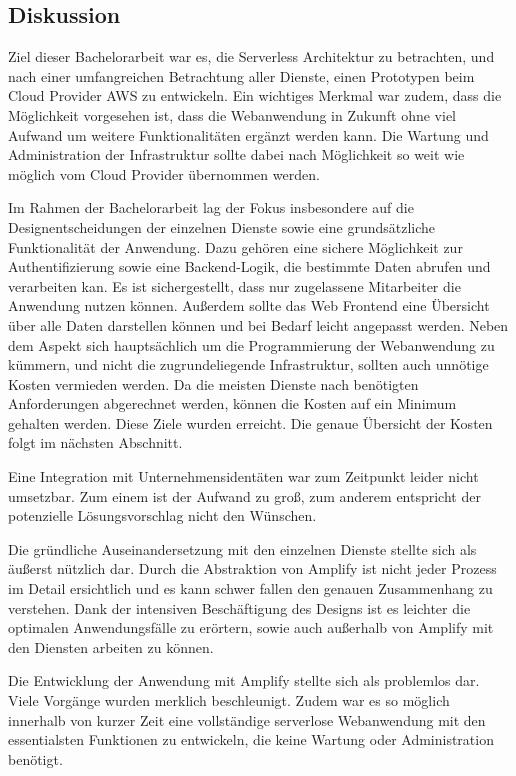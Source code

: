 \subsection{Diskussion}

Ziel dieser Bachelorarbeit war es, die Serverless Architektur zu betrachten, und nach einer umfangreichen Betrachtung aller Dienste, einen Prototypen beim Cloud Provider AWS zu entwickeln.
Ein wichtiges Merkmal war zudem, dass die Möglichkeit vorgesehen ist, dass die Webanwendung in Zukunft ohne viel Aufwand um weitere Funktionalitäten ergänzt werden kann.
Die Wartung und Administration der Infrastruktur sollte dabei nach Möglichkeit so weit wie möglich vom Cloud Provider übernommen werden.

Im Rahmen der Bachelorarbeit lag der Fokus insbesondere auf die Designentscheidungen der einzelnen Dienste sowie eine grundsätzliche Funktionalität der Anwendung.
Dazu gehören eine sichere Möglichkeit zur Authentifizierung sowie eine Backend-Logik, die bestimmte Daten abrufen und verarbeiten kan.
Es ist sichergestellt, dass nur zugelassene Mitarbeiter die Anwendung nutzen können.
Außerdem sollte das Web Frontend eine Übersicht über alle Daten darstellen können und bei Bedarf leicht angepasst werden.
Neben dem Aspekt sich hauptsächlich um die Programmierung der Webanwendung zu kümmern, und nicht die zugrundeliegende Infrastruktur, sollten auch unnötige Kosten vermieden werden.
Da die meisten Dienste nach benötigten Anforderungen abgerechnet werden, können die Kosten auf ein Minimum gehalten werden.
Diese Ziele wurden erreicht. Die genaue Übersicht der Kosten folgt im nächsten Abschnitt.

Eine Integration mit Unternehmensidentäten war zum Zeitpunkt leider nicht umsetzbar.
Zum einem ist der Aufwand zu groß, zum anderem entspricht der potenzielle Lösungsvorschlag nicht den Wünschen.

Die gründliche Auseinandersetzung mit den einzelnen Dienste stellte sich als äußerst nützlich dar.
Durch die Abstraktion von Amplify ist nicht jeder Prozess im Detail ersichtlich und es kann schwer fallen den genauen Zusammenhang zu verstehen.
Dank der intensiven Beschäftigung des Designs ist es leichter die optimalen Anwendungsfälle zu erörtern, sowie auch außerhalb von Amplify mit den Diensten arbeiten zu können.

Die Entwicklung der Anwendung mit Amplify stellte sich als problemlos dar.
Viele Vorgänge wurden merklich beschleunigt.
Zudem war es so möglich innerhalb von kurzer Zeit eine vollständige serverlose Webanwendung mit den essentialsten Funktionen zu entwickeln, die keine Wartung oder Administration benötigt.
\clearpage


